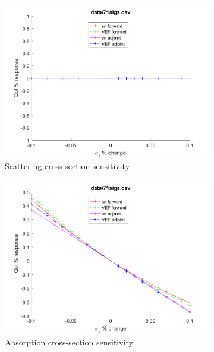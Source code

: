 \documentclass{article}
\begin{document}
\begin{figure}[H]
\begin{subfigure}{.5\textwidth}
  \includegraphics[width=.98\linewidth]{IanProposal/figures2/71sigsSens.png}
  \caption{Scattering cross-section sensitivity}
  \label{fig:sfig2}
\end{subfigure}%
\begin{subfigure}{.5\textwidth}
  \centering
  \includegraphics[width=.98\linewidth]{IanProposal/figures2/71sigaSens.png}
  \caption{Absorption cross-section sensitivity}
  \label{fig:sfig5}
\end{subfigure}%
\caption{}
\label{fig:fig}
\end{figure}
\newpage

\end{document}
